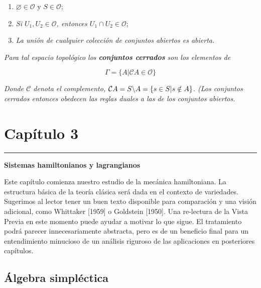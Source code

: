 \documentclass[a4paper,10pt]{article}
\numberwithin{equation}{section}
\begin{document}
\begin{enumerate}[label=(T{\arabic*})]
 \item $\varnothing \in \mathcal{O} \mathcal{}$ y $S \in \mathcal{O}$;
 \item \emph{Si $U_1,U_2 \in \mathcal{O}$, entonces $U_1 \cap U_2 \in \mathcal{O}$};
 \item \emph{La unión de cualquier colección de conjuntos abiertos es abierta.}
\end{enumerate}

\emph{Para tal espacio topológico los \textbf{conjuntos cerrados} son 
los elementos de}

$$
\Gamma = \{A | \mathcal{C} A \in \mathcal{O} \}
$$

\emph{Donde $\mathcal{C}$ denota el complemento, $\mathcal{C}A = S {\char`\\} A = \{s \in S | s \notin A\}$.
(Los conjuntos cerrados entonces obedecen las reglas duales a las de los conjuntos abiertos.}

\vspace{.3cm}

\newpage

\section{{\huge{Capítulo 3}}}

\noindent\rule[0.5ex]{\linewidth}{1pt}

\vspace{.3cm}

{\Large \textbf{Sistemas hamiltonianos y lagrangianos}}

\vspace{4cm}

Este capítulo comienza nuestro estudio de la mecánica hamiltoniana. La 
estructura básica de la teoría clásica será dada en el contexto de 
variedades. Sugerimos al lector tener un buen texto disponible para 
comparación y una visión adicional, como Whittaker [1959] o Goldstein [1950]. 
Una re-lectura de la Vista Previa en este momento puede ayudar a motivar 
lo que sigue. El tratamiento podrá parecer innecesariamente abstracta, 
pero es de un beneficio final para un entendimiento minucioso de un 
análisis riguroso de las aplicaciones en posteriores capítulos.

\subsection{Álgebra simpléctica}
\end{document}
